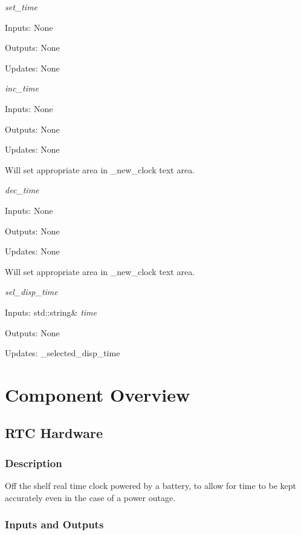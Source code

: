 \documentclass[12pt,titlepage]{article}
\begin{document}
\textit{set\_time} \par
Inputs: None \par
Outputs: None \par
Updates: None \newline

\textit{inc\_time} \par
Inputs: None \par
Outputs: None \par
Updates: None \newline

Will set appropriate area in \_new\_clock text area. \newline

\textit{dec\_time} \par
Inputs: None \par
Outputs: None \par
Updates: None \newline

Will set appropriate area in \_new\_clock text area. \newline

\textit{sel\_disp\_time} \par
Inputs: std::string& \textit{time} \par
Outputs: None \par
Updates: \_selected\_disp\_time \newline





\pagebreak
\section{Component Overview}
\subsection{RTC Hardware}
\subsubsection*{Description}
Off the shelf real time clock powered by a battery, to allow for time to be kept accurately even in the case of a power outage. 
\subsubsection*{Inputs and Outputs}
\end{document}
